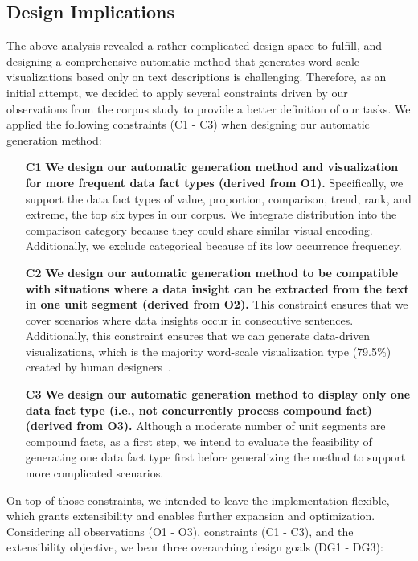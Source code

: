 \subsection{Design Implications}
\label{subsec:formative-constriants-implications}
The above analysis revealed a rather complicated design space to fulfill, and designing a comprehensive automatic method that generates word-scale visualizations based only on text descriptions is challenging.
Therefore, as an initial attempt, we decided to apply several constraints driven by our observations from the corpus study to provide a better definition of our tasks.
We applied the following constraints (C1 - C3) when designing our automatic generation method:
\begin{enumerate}%
    \item[\textbf{C1}] \textbf{We design our automatic generation method and visualization for more frequent data fact types (derived from O1).} Specifically, we support the data fact types of value, proportion, comparison, trend, rank, and extreme, the top six types in our corpus. We integrate distribution into the comparison category because they could share similar visual encoding. Additionally, we exclude categorical because of its low occurrence frequency.
    \item[\textbf{C2}] \textbf{We design our automatic generation method to be compatible with situations where a data insight can be extracted from the text in one unit segment (derived from O2).} This constraint ensures that we cover scenarios where data insights occur in consecutive sentences. Additionally, this constraint ensures that we can generate data-driven visualizations, which is the majority word-scale visualization type (79.5\%) created by human designers~\cite{goffin2017Exploratory}.
    \item[\textbf{C3}] \textbf{We design our automatic generation method to display only one data fact type (i.e., not concurrently process compound fact) (derived from O3).}  Although a moderate number of unit segments are compound facts, as a first step, we intend to evaluate the feasibility of generating one data fact type first before generalizing the method to support more complicated scenarios.
\end{enumerate}

On top of those constraints, we intended to leave the implementation flexible, which grants extensibility and enables further expansion and optimization. Considering all observations (O1 - O3), constraints (C1 - C3), and the extensibility objective, we bear three overarching design goals (DG1 - DG3):

